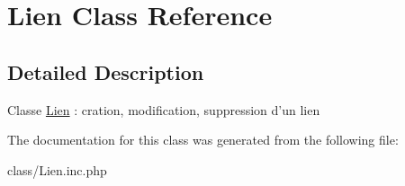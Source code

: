 \hypertarget{class_lien}{
\section{Lien Class Reference}
\label{class_lien}
}


\subsection{Detailed Description}
Classe \hyperlink{class_lien}{Lien} : cration, modification, suppression d'un lien 

The documentation for this class was generated from the following file:\begin{DoxyCompactItemize}
\item 
class/Lien.inc.php\end{DoxyCompactItemize}
